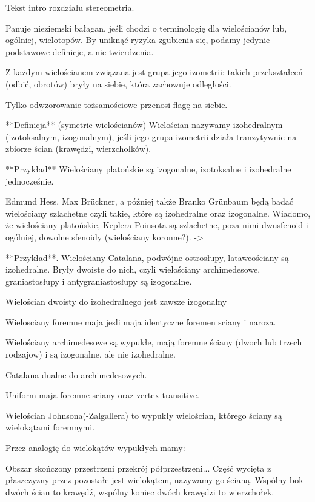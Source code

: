 
Tekst intro rozdziału stereometria.

Panuje nieziemski bałagan, jeśli chodzi o terminologię dla wielościanów lub, ogólniej, wielotopów. By uniknąć ryzyka zgubienia się, podamy jedynie podstawowe definicje, a nie twierdzenia.


Z każdym wielościanem związana jest grupa jego izometrii: takich przekształceń (odbić, obrotów) bryły na siebie, która zachowuje odległości.

Tylko odwzorowanie tożsamościowe przenosi flagę na siebie.

**Definicja** (symetrie wielościanów) Wielościan nazywamy izohedralnym (izotoksalnym, izogonalnym), jeśli jego grupa izometrii działa tranzytywnie na zbiorze ścian (krawędzi, wierzchołków).

**Przykład** Wielościany platońskie są izogonalne, izotoksalne i izohedralne jednocześnie.

Edmund Hess, Max Brückner, a później także Branko Grünbaum będą badać wielościany szlachetne czyli takie, które są izohedralne oraz izogonalne. Wiadomo, że wielościany platońskie, Keplera-Poinsota są szlachetne, poza nimi dwusfenoid i ogólniej, dowolne sfenoidy (wielościany koronne?). -> %

**Przykład**. Wielościany Catalana, podwójne ostrosłupy, latawcościany są izohedralne. Bryły dwoiste do nich, czyli wielościany archimedesowe, graniastosłupy i antygraniastosłupy są izogonalne.

Wielościan dwoisty do izohedralnego jest zawsze izogonalny

Wielosciany foremne maja jesli maja identyczne foremen sciany i naroza.

Wielościany archimedesowe są wypukłe, mają foremne ściany (dwoch lub trzech rodzajow) i są izogonalne, ale nie izohedralne.

Catalana dualne do archimedesowych.

Uniform maja foremne sciany oraz vertex-transitive.

Wielościan Johnsona(-Zalgallera) to wypukły wielościan, którego ściany są wielokątami foremnymi.


Przez analogię do wielokątów wypukłych mamy:

\begin{definition}
    Obszar skończony przestrzeni przekrój półprzestrzeni...
    Część wycięta z płaszczyzny przez pozostałe jest wielokątem, nazywamy go ścianą.
    Wspólny bok dwóch ścian to krawędź, wspólny koniec dwóch krawędzi to wierzchołek.
\end{definition}


